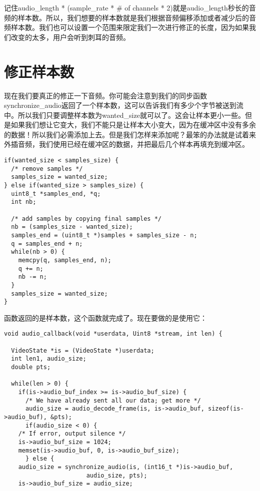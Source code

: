 记住audio_length * (sample_rate * \# of channels * 2)就是audio_length秒长的音频的样本数。所以，我们想要的样本数就是我们根据音频偏移添加或者减少后的音频样本数。我们也可以设置一个范围来限定我们一次进行修正的长度，因为如果我们改变的太多，用户会听到刺耳的音频。

\section{修正样本数}

现在我们要真正的修正一下音频。你可能会注意到我们的同步函数synchronize_audio返回了一个样本数，这可以告诉我们有多少个字节被送到流中。所以我们只要调整样本数为wanted_size就可以了。这会让样本更小一些。但是如果我们想让它变大，我们不能只是让样本大小变大，因为在缓冲区中没有多余的数据！所以我们必需添加上去。但是我们怎样来添加呢？最笨的办法就是试着来外插音频，我们使用已经在缓冲区的数据，并把最后几个样本再填充到缓冲区。

\begin{lstlisting}
if(wanted_size < samples_size) {
  /* remove samples */
  samples_size = wanted_size;
} else if(wanted_size > samples_size) {
  uint8_t *samples_end, *q;
  int nb;

  /* add samples by copying final samples */
  nb = (samples_size - wanted_size);
  samples_end = (uint8_t *)samples + samples_size - n;
  q = samples_end + n;
  while(nb > 0) {
    memcpy(q, samples_end, n);
    q += n;
    nb -= n;
  }
  samples_size = wanted_size;
}
\end{lstlisting}

函数返回的是样本数，这个函数就完成了。现在要做的是使用它：

\begin{lstlisting}
void audio_callback(void *userdata, Uint8 *stream, int len) {

  VideoState *is = (VideoState *)userdata;
  int len1, audio_size;
  double pts;

  while(len > 0) {
    if(is->audio_buf_index >= is->audio_buf_size) {
      /* We have already sent all our data; get more */
      audio_size = audio_decode_frame(is, is->audio_buf, sizeof(is->audio_buf), &pts);
      if(audio_size < 0) {
    /* If error, output silence */
    is->audio_buf_size = 1024;
    memset(is->audio_buf, 0, is->audio_buf_size);
      } else {
    audio_size = synchronize_audio(is, (int16_t *)is->audio_buf,
                       audio_size, pts);
    is->audio_buf_size = audio_size;
\end{lstlisting}

